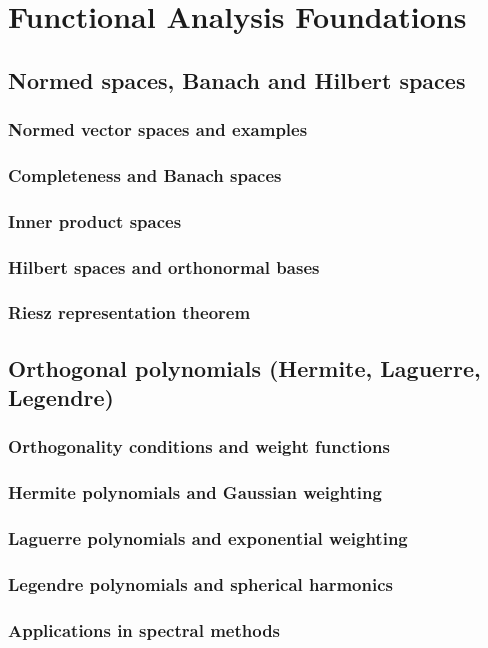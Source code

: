 ﻿\chapter{Functional Analysis Foundations}
\section{Normed spaces, Banach and Hilbert spaces}
\subsection{Normed vector spaces and examples}
\subsection{Completeness and Banach spaces}
\subsection{Inner product spaces}
\subsection{Hilbert spaces and orthonormal bases}
\subsection{Riesz representation theorem}

\section{Orthogonal polynomials (Hermite, Laguerre, Legendre)}
\subsection{Orthogonality conditions and weight functions}
\subsection{Hermite polynomials and Gaussian weighting}
\subsection{Laguerre polynomials and exponential weighting}
\subsection{Legendre polynomials and spherical harmonics}
\subsection{Applications in spectral methods}

